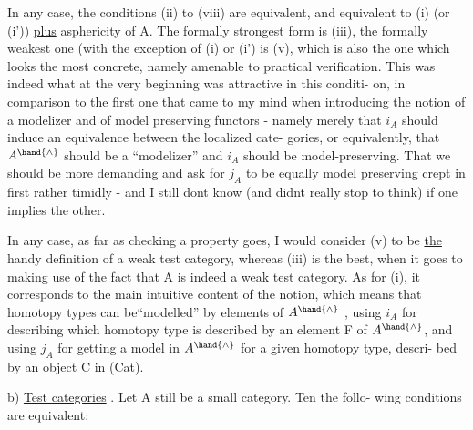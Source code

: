 In any case,  the conditions (ii) to (viii) are equivalent,  and
equivalent to  (i)  (or (i'))  \uline{plus}  asphericity of A.  The formally
strongest form is (iii),  the formally weakest one (with the exception
of (i) or (i')\hand{)}  is (v),  which is also the one
which looks the most concrete,  namely amenable to practical verification.
This was indeed what at the very beginning was attractive in this conditi-%
on,  in comparison to the first one that came to my mind when introducing
the notion of a modelizer and of model preserving functors  -  namely 
merely that  $i_A$  should induce an equivalence between the localized cate-%
gories,  or equivalently,  that $A^{\hand{\wedge}}$ should be a ``modelizer'' and $i_A$ should
be model-preserving.  That we should be more demanding and ask for $j_A$ to
be equally model preserving crept in first rather timidly  -  and I still
dont know (and didnt really stop to think)  if  one implies the other\deleted{(***)}.

In any case,  as far as checking a property goes,  I would consider
(v) to be \uline{the} handy definition of a weak test category,  whereas (iii)
is the best,  when it goes to making use of the fact that A is indeed a
weak test category.  As for (i),  
it corresponds to the main intuitive content of the notion,  which means
that homotopy types can be``modelled'' by elements of $A^{\hand{\wedge}}$  ,  using
$i_A$ for describing which homotopy type is described by an element F of $A^{\hand{\wedge}}$,
and using $j_A$ for getting a model in $A^{\hand{\wedge}}$ for a given homotopy type, descri-%
bed by an object C in (Cat).

b)   \uline{Test categories} .  Let A still be a small category.  Ten the follo-%
wing conditions are equivalent:

